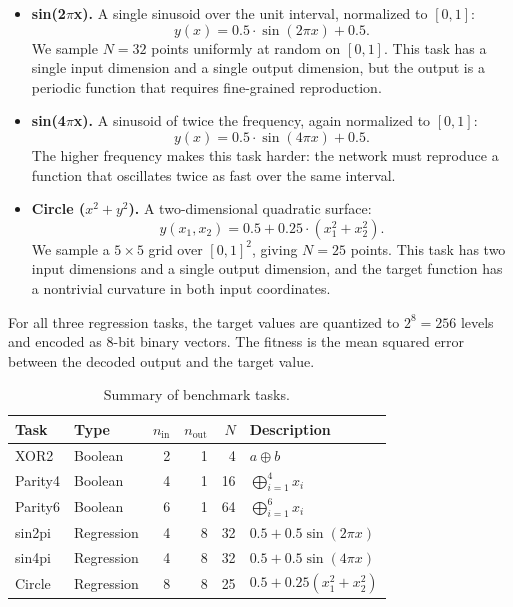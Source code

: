 \begin{itemize}
  \item \textbf{sin(2\texorpdfstring{$\pi$}{pi}x).} A single sinusoid
    over the unit interval, normalized to $[0, 1]$:
    \[
      y(x) = 0.5 \cdot \sin(2\pi x) + 0.5.
    \]
    We sample $N = 32$ points uniformly at random on $[0, 1]$. This
    task has a single input dimension and a single output dimension,
    but the output is a periodic function that requires fine-grained
    reproduction.

  \item \textbf{sin(4\texorpdfstring{$\pi$}{pi}x).} A sinusoid of
    twice the frequency, again normalized to $[0, 1]$:
    \[
      y(x) = 0.5 \cdot \sin(4\pi x) + 0.5.
    \]
    The higher frequency makes this task harder: the network must
    reproduce a function that oscillates twice as fast over the same
    interval.

  \item \textbf{Circle ($x^2 + y^2$).} A two-dimensional quadratic
    surface:
    \[
      y(x_1, x_2) = 0.5 + 0.25 \cdot (x_1^2 + x_2^2).
    \]
    We sample a $5 \times 5$ grid over $[0, 1]^2$, giving $N = 25$
    points. This task has two input dimensions and a single output
    dimension, and the target function has a nontrivial curvature in
    both input coordinates.
\end{itemize}

For all three regression tasks, the target values are quantized to
$2^{8} = 256$ levels and encoded as $8$-bit binary vectors. The
fitness is the mean squared error between the decoded output and the
target value.

\begin{table}[h]
  \centering
  \small
  \caption{Summary of benchmark tasks.}
  \label{tab:tasks}
  \begin{tabular}{llrrrl}
    \toprule
    \textbf{Task} & \textbf{Type} & $n_{\text{in}}$ & $n_{\text{out}}$
      & $N$ & \textbf{Description} \\
    \midrule
    XOR2      & Boolean    & 2 & 1 &  4 & $a \oplus b$ \\
    Parity4   & Boolean    & 4 & 1 & 16 & $\bigoplus_{i=1}^4 x_i$ \\
    Parity6   & Boolean    & 6 & 1 & 64 & $\bigoplus_{i=1}^6 x_i$ \\
    sin2pi    & Regression & 4 & 8 & 32 & $0.5 + 0.5\sin(2\pi x)$ \\
    sin4pi    & Regression & 4 & 8 & 32 & $0.5 + 0.5\sin(4\pi x)$ \\
    Circle    & Regression & 8 & 8 & 25 & $0.5 + 0.25(x_1^2 + x_2^2)$ \\
    \bottomrule
  \end{tabular}
\end{table}

